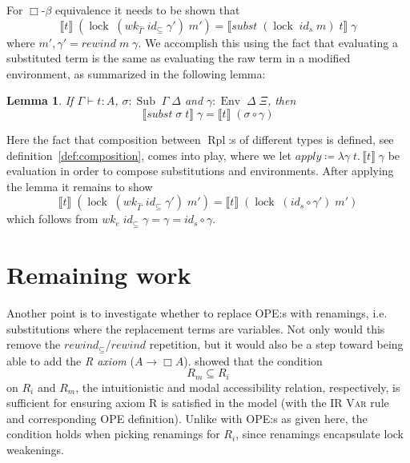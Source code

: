 \documentclass{article}
\newtheorem{lemma}[theorem]{Lemma}
\theoremstyle{definition}\newtheorem{definition}{Definition}
\begin{document}
For $\Box\text{-}\beta$ equivalence it needs to be shown that
$$ \llbracket t \rrbracket \; (\operatorname{lock} \; (\textit{wk}_{\widehat\Gamma} \; \textit{id}_\subseteq \; \gamma') \; m') = \llbracket \textit{subst} \; (\operatorname{lock} \; \textit{id}_s \; m) \; t \rrbracket \; \gamma $$
where $m' , \gamma' = \textit{rewind} \; m \; \gamma$.
We accomplish this using the fact that evaluating a substituted term
is the same as evaluating the raw term in a modified environment,
as summarized in the following lemma:
\begin{lemma}
  If $\Gamma \vdash t : A$, $\sigma : \operatorname{Sub} \; \Gamma \; \Delta$
  and $\gamma : \operatorname{Env} \; \Delta \; \Xi$, then
  $$ \llbracket \textit{subst} \; \sigma \; t \rrbracket \; \gamma = \llbracket t \rrbracket \; (\sigma \circ \gamma) $$
\end{lemma}
Here the fact that composition between $\operatorname{Rpl}$:s of different types is defined,
see definition~\ref{def:composition}, comes into play,
where we let $\textit{apply} \coloneqq \lambda \gamma \; t.\, \llbracket t \rrbracket \; \gamma$ be evaluation
in order to compose substitutions and environments.
After applying the lemma it remains to show
$$ \llbracket t \rrbracket \; (\operatorname{lock} \; (\textit{wk}_{\widehat\Gamma} \; \textit{id}_\subseteq \; \gamma') \; m') = \llbracket t \rrbracket \; (\operatorname{lock} \; (\textit{id}_s \circ \gamma') \; m') $$
which follows from
$wk_e \; \textit{id}_\subseteq \; \gamma = \gamma = \textit{id}_s \circ \gamma$.

\section{Remaining work}

Another point is to investigate whether to replace OPE:s with renamings,
i.e. substitutions where the replacement terms are variables.
Not only would this remove
the $\textit{rewind}_\subseteq$/$\textit{rewind}$ repetition,
but it would also be a step toward being able to add the \emph{R axiom}
($A \to \Box A$).
\textcite{valliappan-r} showed that the condition
$$ R_m \subseteq R_i $$
on $R_i$ and $R_m$,
the intuitionistic and modal accessibility relation, respectively,
is sufficient for ensuring axiom R is satisfied in the model
(with the IR \textsc{Var} rule and corresponding OPE definition).
Unlike with OPE:s as given here,
the condition holds when picking renamings for $R_i$,
since renamings encapsulate lock weakenings.

\printbibliography
\end{document}
